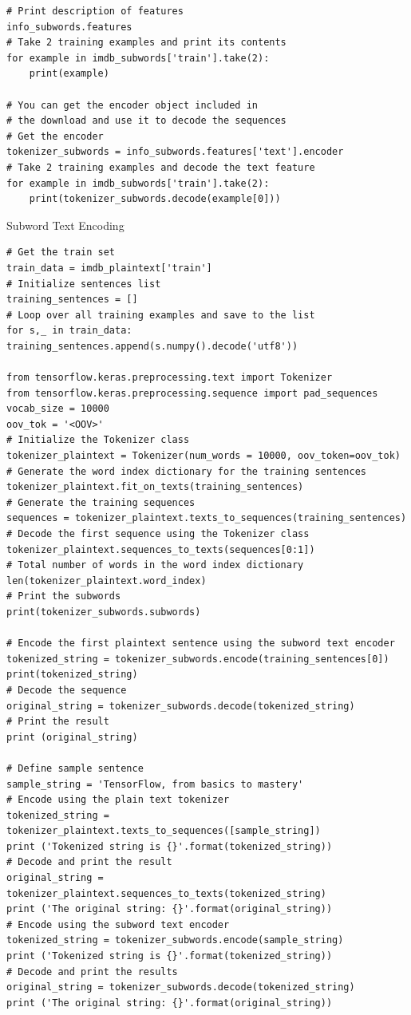 \documentclass[20pt]{article}
\begin{document}
\begin{itemize}
\begin{verbatim}
# Print description of features
info_subwords.features
# Take 2 training examples and print its contents
for example in imdb_subwords['train'].take(2):
	print(example)

# You can get the encoder object included in
# the download and use it to decode the sequences
# Get the encoder
tokenizer_subwords = info_subwords.features['text'].encoder
# Take 2 training examples and decode the text feature
for example in imdb_subwords['train'].take(2):
	print(tokenizer_subwords.decode(example[0]))
		\end{verbatim}
		Subword Text Encoding
		\begin{verbatim}
# Get the train set
train_data = imdb_plaintext['train']
# Initialize sentences list
training_sentences = []
# Loop over all training examples and save to the list
for s,_ in train_data:
training_sentences.append(s.numpy().decode('utf8'))

from tensorflow.keras.preprocessing.text import Tokenizer
from tensorflow.keras.preprocessing.sequence import pad_sequences
vocab_size = 10000
oov_tok = '<OOV>'
# Initialize the Tokenizer class
tokenizer_plaintext = Tokenizer(num_words = 10000, oov_token=oov_tok)
# Generate the word index dictionary for the training sentences
tokenizer_plaintext.fit_on_texts(training_sentences)
# Generate the training sequences
sequences = tokenizer_plaintext.texts_to_sequences(training_sentences)
# Decode the first sequence using the Tokenizer class
tokenizer_plaintext.sequences_to_texts(sequences[0:1])
# Total number of words in the word index dictionary
len(tokenizer_plaintext.word_index)
# Print the subwords
print(tokenizer_subwords.subwords)

# Encode the first plaintext sentence using the subword text encoder
tokenized_string = tokenizer_subwords.encode(training_sentences[0])
print(tokenized_string)
# Decode the sequence
original_string = tokenizer_subwords.decode(tokenized_string)
# Print the result
print (original_string)

# Define sample sentence
sample_string = 'TensorFlow, from basics to mastery'
# Encode using the plain text tokenizer
tokenized_string = tokenizer_plaintext.texts_to_sequences([sample_string])
print ('Tokenized string is {}'.format(tokenized_string))
# Decode and print the result
original_string = tokenizer_plaintext.sequences_to_texts(tokenized_string)
print ('The original string: {}'.format(original_string))
# Encode using the subword text encoder
tokenized_string = tokenizer_subwords.encode(sample_string)
print ('Tokenized string is {}'.format(tokenized_string))
# Decode and print the results
original_string = tokenizer_subwords.decode(tokenized_string)
print ('The original string: {}'.format(original_string))


\end{verbatim}
\end{itemize}
\end{document}
